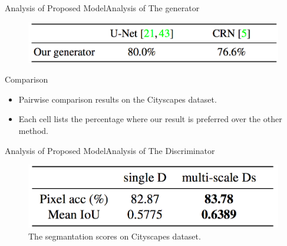 \documentclass{beamer}
\begin{document}
\begin{frame}{Analysis of Proposed Model}{Analysis of  The generator}
\begin{figure}
	\centering
	\includegraphics[height=0.2\textheight]{images/table_3}
\end{figure}
%
%
\begin{beamerboxesrounded}[upper=uppercol,lower=lowercol,shadow=false]{Comparison }
	\begin{itemize}
		\item
Pairwise comparison results on the Cityscapes dataset.
\item
 Each cell lists the percentage where our result is preferred over the other method.
 \end{itemize}
\end{beamerboxesrounded}
\end{frame}

\begin{frame}{Analysis of Proposed Model}{Analysis of The Discriminator}
\begin{figure}
	\centering
	\includegraphics[height=0.3\textheight]{images/table_4}
	\caption{The segmantation scores on Cityscapes dataset.}
\end{figure}

\end{frame}
\end{document}
